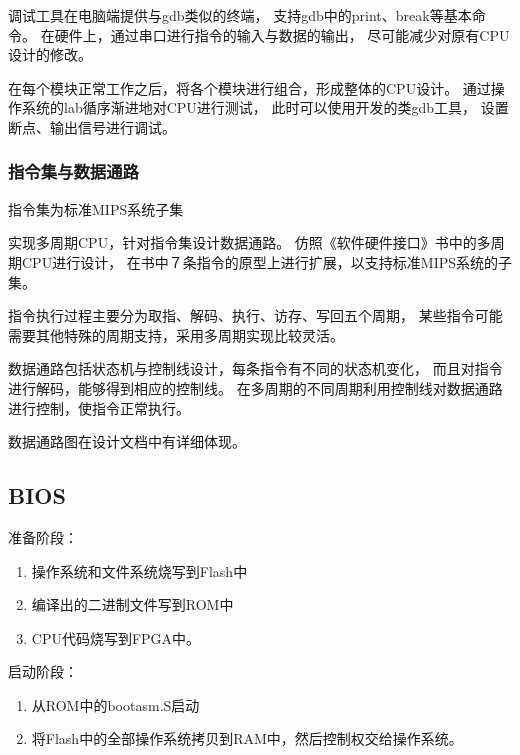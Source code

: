             调试工具在电脑端提供与gdb类似的终端，%
            支持gdb中的print、break等基本命令。%
            在硬件上，通过串口进行指令的输入与数据的输出，%
            尽可能减少对原有CPU设计的修改。
            
            在每个模块正常工作之后，将各个模块进行组合，形成整体的CPU设计。%
            通过操作系统的lab循序渐进地对CPU进行测试，%
            此时可以使用开发的类gdb工具，%
            设置断点、输出信号进行调试。
            
        \subsubsection{指令集与数据通路}
            指令集为标准MIPS系统子集

            实现多周期CPU，针对指令集设计数据通路。
            仿照《软件硬件接口》书中的多周期CPU进行设计，
            在书中７条指令的原型上进行扩展，以支持标准MIPS系统的子集。
            
            指令执行过程主要分为取指、解码、执行、访存、写回五个周期，
            某些指令可能需要其他特殊的周期支持，采用多周期实现比较灵活。

            数据通路包括状态机与控制线设计，每条指令有不同的状态机变化，
            而且对指令进行解码，能够得到相应的控制线。%
            在多周期的不同周期利用控制线对数据通路进行控制，使指令正常执行。
            
            数据通路图在设计文档中有详细体现。

            
    \subsection{BIOS}
        准备阶段：
        \begin{enumerate}
            \item
                操作系统和文件系统烧写到Flash中%
            \item
                编译出的二进制文件写到ROM中
            \item
                CPU代码烧写到FPGA中。
        \end{enumerate}

        启动阶段：
        \begin{enumerate}
            \item
                从ROM中的bootasm.S启动
            \item
                将Flash中的全部操作系统拷贝到RAM中，然后控制权交给操作系统。
        \end{enumerate}

